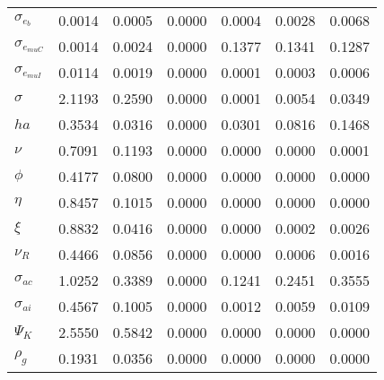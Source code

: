 \begin{center}
\begin{longtable}{lcccccc}
$ \sigma_{{e_b}}       $	 & 	          0.0014	 & 	          0.0005	 & 	          0.0000	 & 	          0.0004	 & 	          0.0028	 & 	          0.0068 \\ 
$ \sigma_{{e_{muC}}}   $	 & 	          0.0014	 & 	          0.0024	 & 	          0.0000	 & 	          0.1377	 & 	          0.1341	 & 	          0.1287 \\ 
$ \sigma_{{e_{muI}}}   $	 & 	          0.0114	 & 	          0.0019	 & 	          0.0000	 & 	          0.0001	 & 	          0.0003	 & 	          0.0006 \\ 
$ {\sigma}             $	 & 	          2.1193	 & 	          0.2590	 & 	          0.0000	 & 	          0.0001	 & 	          0.0054	 & 	          0.0349 \\ 
$ {ha}                 $	 & 	          0.3534	 & 	          0.0316	 & 	          0.0000	 & 	          0.0301	 & 	          0.0816	 & 	          0.1468 \\ 
$ \nu                  $	 & 	          0.7091	 & 	          0.1193	 & 	          0.0000	 & 	          0.0000	 & 	          0.0000	 & 	          0.0001 \\ 
$ {\phi}               $	 & 	          0.4177	 & 	          0.0800	 & 	          0.0000	 & 	          0.0000	 & 	          0.0000	 & 	          0.0000 \\ 
$ {\eta}               $	 & 	          0.8457	 & 	          0.1015	 & 	          0.0000	 & 	          0.0000	 & 	          0.0000	 & 	          0.0000 \\ 
$ \xi                  $	 & 	          0.8832	 & 	          0.0416	 & 	          0.0000	 & 	          0.0000	 & 	          0.0002	 & 	          0.0026 \\ 
$ {\nu_R}              $	 & 	          0.4466	 & 	          0.0856	 & 	          0.0000	 & 	          0.0000	 & 	          0.0006	 & 	          0.0016 \\ 
$ {\sigma_{ac}}        $	 & 	          1.0252	 & 	          0.3389	 & 	          0.0000	 & 	          0.1241	 & 	          0.2451	 & 	          0.3555 \\ 
$ {\sigma_{ai}}        $	 & 	          0.4567	 & 	          0.1005	 & 	          0.0000	 & 	          0.0012	 & 	          0.0059	 & 	          0.0109 \\ 
$ {\Psi_{K}}           $	 & 	          2.5550	 & 	          0.5842	 & 	          0.0000	 & 	          0.0000	 & 	          0.0000	 & 	          0.0000 \\ 
$ {\rho_g}             $	 & 	          0.1931	 & 	          0.0356	 & 	          0.0000	 & 	          0.0000	 & 	          0.0000	 & 	          0.0000 \\ 

\end{longtable}
\end{center}
